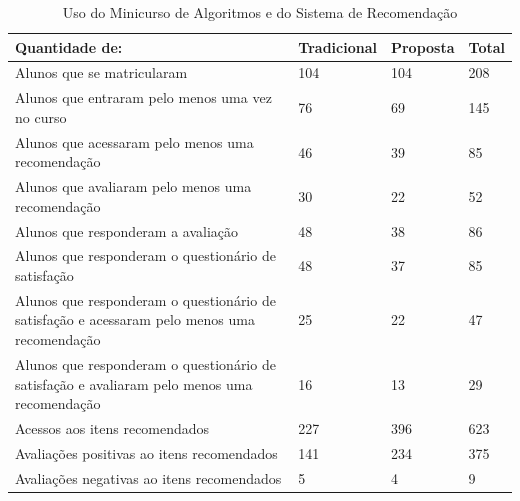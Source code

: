\begin{table}[h]
\centering
\caption{Uso do Minicurso de Algoritmos e do Sistema de Recomendação}
\label{tab:uso-minicurso-sr}
\begin{tabular}{|p{7.5cm}|p{2.5cm}|p{2.5cm}|p{2.5cm}|}
\hline
\textbf{Quantidade de:}                                                                     & \textbf{Tradicional} & \textbf{Proposta}    & \textbf{Total}    \\
\hline
Alunos que se matricularam                                                                  & 104                  & 104                  & 208      \\
\hline
Alunos que entraram pelo menos uma vez no curso                                             & 76                   & 69                   & 145      \\
\hline
Alunos que acessaram pelo menos uma recomendação                                            & 46                   & 39                   & 85       \\
\hline
Alunos que avaliaram pelo menos uma recomendação                                            & 30                   & 22                   & 52       \\
\hline
Alunos que responderam a avaliação                                                          & 48                   & 38                   & 86       \\
\hline
Alunos que responderam o questionário de satisfação                                         & 48                   & 37                   & 85       \\
\hline
Alunos que responderam o questionário de satisfação e acessaram pelo menos uma recomendação & 25                   & 22                   & 47       \\
\hline
Alunos que responderam o questionário de satisfação e avaliaram pelo menos uma recomendação & 16                   & 13                   & 29       \\
\hline
Acessos aos itens recomendados                                                              & 227                  & 396                  & 623      \\
\hline
Avaliações positivas ao itens recomendados                                                  & 141                  & 234                  & 375      \\
\hline
Avaliações negativas ao itens recomendados                                                  & 5                    & 4                    & 9        \\
\hline
\end{tabular}
\end{table}

